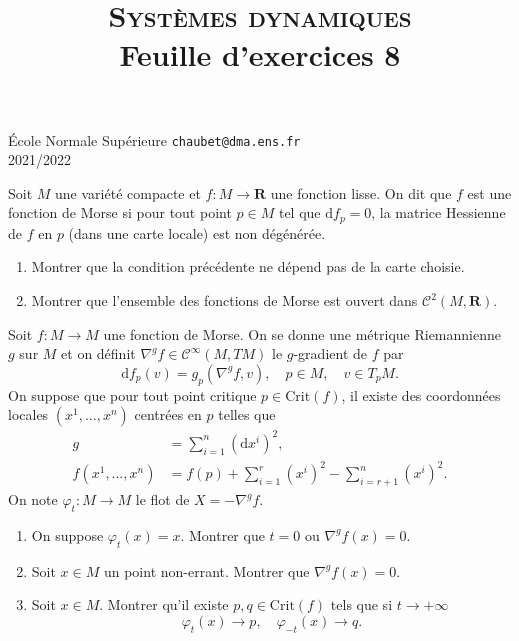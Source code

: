 \documentclass[a4paper,10pt,openany]{article}
\title{\textsc{Syst\`emes dynamiques} \\ Feuille d'exercices 8}
\date{}
\author{}
\theoremstyle{plain}
\theoremstyle{definition}
\newcommand{\dd}{\mathrm{d}}
\newcommand{\R}{\mathbf{R}}
\begin{document}
{\noindent \'Ecole Normale Sup\'erieure  \hfill  \texttt{chaubet@dma.ens.fr} } \\
{2021/2022 \hfill}

{\let\newpage\relax\maketitle}
\maketitle
{} \vspace{1.5mm} 

\noindent Soit $M$ une vari\'et\'e compacte et $f : M \to \R$ une fonction lisse. On dit que $f$ est une fonction de Morse si pour tout point $p \in M$ tel que $\dd f_p = 0$, la matrice Hessienne de $f$ en $p$ (dans une carte locale) est non d\'eg\'en\'er\'ee.
\begin{enumerate}
\item Montrer que la condition pr\'ec\'edente ne d\'epend pas de la carte choisie.
\item Montrer que l'ensemble des fonctions de Morse est ouvert dans $\mathcal{C}^2(M, \R).$
\end{enumerate}
Soit $f : M \to M$ une fonction de Morse. On se donne une m\'etrique Riemannienne $g$ sur $M$ et on d\'efinit $\nabla^g f \in \mathcal{C}^\infty(M,TM)$ le $g$-gradient de $f$ par
$$
\dd f_p(v) = g_p(\nabla^g f, v), \quad p \in M, \quad v \in T_pM.
$$
On suppose que pour tout point critique $p \in \mathrm{Crit}(f)$, il existe des coordonn\'ees locales $(x^1, \dots, x^n)$ centr\'ees en $p$ telles que
$$
\begin{aligned}
g &= \sum_{i=1}^n (\dd x^i)^2, \\
f(x^1, \dots, x^n) &= f(p) + \sum_{i=1}^r (x^i)^2 - \sum_{i=r+1}^n (x^i)^2.
\end{aligned}
$$
On note $\varphi_t : M \to M$ le flot de $X = -\nabla^gf$.
\begin{enumerate}[resume]
\item On suppose $\varphi_t(x) = x$. Montrer que $t = 0$ ou $\nabla^gf (x) = 0$.
\item Soit $x \in M$ un point non-errant. Montrer que $\nabla^g f(x) = 0$.
\item Soit $x \in M$. Montrer qu'il existe $p,q \in \mathrm{Crit}(f)$ tels que si $t \to +\infty$
$$
\varphi_t(x) \to p, \quad \varphi_{-t}(x) \to q.
$$
\end{enumerate}
\end{document}
